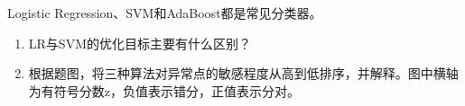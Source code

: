 Logistic Regression、SVM和AdaBoost都是常见分类器。



\begin{enumerate}[start=1]

\item [6分] LR与SVM的优化目标主要有什么区别？

\item [4分] 根据题图，将三种算法对异常点的敏感程度从高到低排序，并解释。图中横轴为有符号分数z，负值表示错分，正值表示分对。

\end{enumerate}
